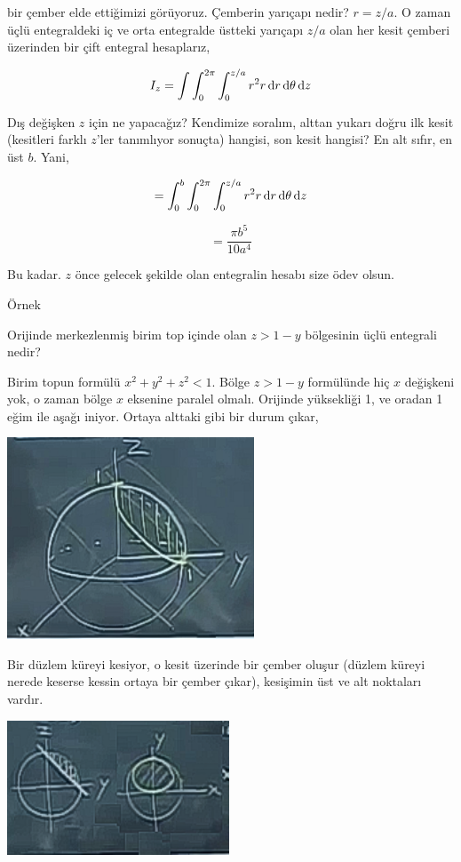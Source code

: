 \documentclass[12pt,fleqn]{article}\usepackage{../../common}
\begin{document}
bir çember elde ettiğimizi görüyoruz. Çemberin yarıçapı nedir? $r = z/a$. O
zaman üçlü entegraldeki iç ve orta entegralde üstteki yarıçapı $z/a$ olan
her kesit çemberi üzerinden bir çift entegral hesaplarız,

$$ 
I_z = \int \int _{0}^{2\pi} \int _{0}^{z/a} r^2 r \,\mathrm{d} r \,\mathrm{d} \theta \,\mathrm{d} z
$$

Dış değişken $z$ için ne yapacağız? Kendimize soralım, alttan yukarı doğru
ilk kesit (kesitleri farklı $z$'ler tanımlıyor sonuçta) hangisi, son kesit
hangisi? En alt sıfır, en üst $b$. Yani,

$$ 
 = \int _{0}^{b} \int _{0}^{2\pi} \int _{0}^{z/a} r^2 r \,\mathrm{d} r \,\mathrm{d} \theta \,\mathrm{d} z
$$

$$ = \frac{\pi b^5}{10 a^4}$$

Bu kadar. $z$ önce gelecek şekilde olan entegralin hesabı size ödev olsun. 

Örnek

Orijinde merkezlenmiş birim top içinde olan $z > 1-y$ bölgesinin üçlü
entegrali nedir? 

Birim topun formülü $x^2 + y^2 + z^2 < 1$. Bölge $z > 1-y$ formülünde hiç
$x$ değişkeni yok, o zaman bölge $x$ eksenine paralel olmalı. Orijinde
yüksekliği 1, ve oradan 1 eğim ile aşağı iniyor. Ortaya alttaki gibi bir
durum çıkar,

\includegraphics[height=6cm]{25_13.png}

Bir düzlem küreyi kesiyor, o kesit üzerinde bir çember oluşur (düzlem
küreyi nerede keserse kessin ortaya bir çember çıkar), kesişimin üst ve alt
noktaları vardır. 

\includegraphics[height=4cm]{25_14.png}
\end{document}
